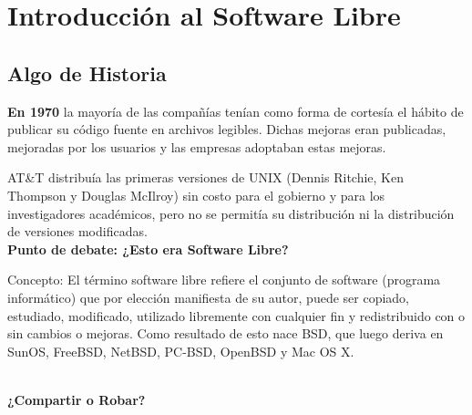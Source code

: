 \chapter{Introducción al Software Libre}
\section{Algo de Historia}

{\bf En 1970} la mayoría de las compañías tenían como forma de cortesía el hábito de publicar su código fuente en archivos legibles. Dichas mejoras eran publicadas, mejoradas por los usuarios y las empresas adoptaban estas mejoras.

AT\&T distribuía las primeras versiones de UNIX (Dennis Ritchie, Ken Thompson y Douglas McIlroy) sin costo para el gobierno y para los investigadores académicos, pero no se permitía su distribución ni la distribución de versiones modificadas. 
\\
{\bf Punto de debate: ¿Esto era Software Libre?}
{\it 

Concepto:
El término software libre refiere el conjunto de software (programa informático) que por elección manifiesta de su autor, puede ser copiado, estudiado, modificado, utilizado libremente con cualquier fin y redistribuido con o sin cambios o mejoras.
Como resultado de esto nace BSD, que luego deriva en SunOS, FreeBSD, NetBSD, PC-BSD, OpenBSD y Mac OS X.
}
\\
{\bf ¿Compartir o Robar?}

